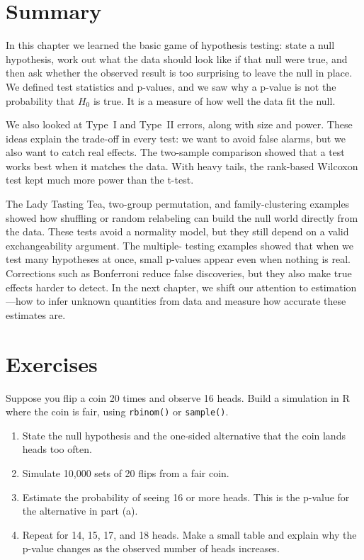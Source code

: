 \section{Summary}

In this chapter we learned the basic game of hypothesis testing:
state a null hypothesis, work out what the data should look like if
that null were true, and then ask whether the observed result is too
surprising to leave the null in place. We defined test statistics and
p-values, and we saw why a p-value is not the probability that $H_0$
is true. It is a measure of how well the data fit the null.

We also looked at Type~I and Type~II errors, along with size and
power. These ideas explain the trade-off in every test: we want to
avoid false alarms, but we also want to catch real effects. The
two-sample comparison showed that a test works best when it matches
the data. With heavy tails, the rank-based Wilcoxon test kept much
more power than the t-test.

The Lady Tasting Tea, two-group permutation, and family-clustering
examples showed how shuffling or random relabeling can build the null
world directly from the data. These tests avoid a normality model, but
they still depend on a valid exchangeability argument. The multiple-
testing examples showed that when we test many hypotheses at once, small
p-values appear even when nothing is real. Corrections such as
Bonferroni reduce false discoveries, but they also make true effects
harder to detect. In the next chapter, we shift our attention to
estimation---how to infer unknown quantities from data and measure how
accurate these estimates are.

\section{Exercises}

\begin{exercise}
Suppose you flip a coin 20 times and observe 16 heads. Build a
simulation in R where the coin is fair, using \lstinline{rbinom()} or
\lstinline{sample()}.
\begin{enumerate}[label=(\alph*)]
\item State the null hypothesis and the one-sided alternative that the
  coin lands heads too often.
\item Simulate 10,000 sets of 20 flips from a fair coin.
\item Estimate the probability of seeing 16 or more heads. This is the
  p-value for the alternative in part (a).
\item Repeat for 14, 15, 17, and 18 heads. Make a small table and
  explain why the p-value changes as the observed number of heads
  increases.
\end{enumerate}
\end{exercise}

